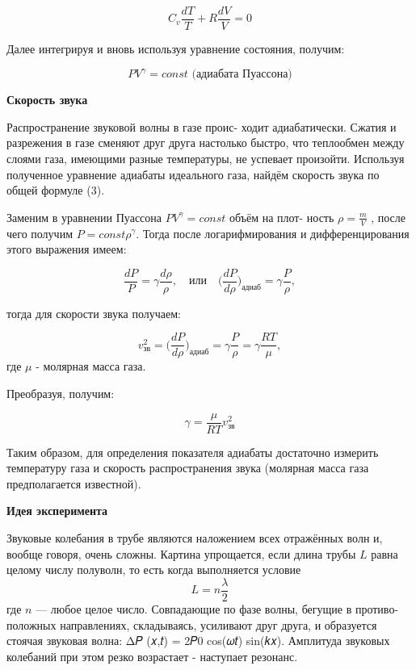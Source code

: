 \documentclass[12pt]{article}
\begin{document}
    \begin{equation}
        C_v \frac{dT}{T} + R \frac{dV}{V} = 0
    \end{equation}

    Далее интегрируя и вновь используя уравнение состояния, получим:

    \begin{equation}
        PV^{\gamma} = const
        \text{  (адиабата Пуассона)}
    \end{equation}

    \textbf{Скорость звука}

    Распространение звуковой волны в газе проис- ходит адиабатически. Сжатия и разрежения в газе сменяют друг друга настолько быстро, что теплообмен между слоями газа, имеющими разные температуры, не успевает произойти. Используя полученное уравнение адиабаты идеального газа, найдём скорость звука по общей формуле (3).

    Заменим в уравнении Пуассона $PV^{\gamma} = const$ объём на плот- ность $\rho = \frac{m}{V}$ , после чего получим $P = const \rho^{\gamma} $. Тогда после логарифмирования и дифференцирования этого выражения имеем:

    \begin{equation}
        \frac{dP}{P} = \gamma \frac {d\rho}{\rho}, \quad \text{или} \quad \bigg(\frac{dP}{d\rho}\bigg)_\text{адиаб} = \gamma \frac{P}{\rho},
    \end{equation}

    тогда для скорости звука получаем:

    \begin{equation}
        v_\text{зв}^2 = \bigg(\frac{dP}{d\rho}\bigg)_\text{адиаб} = \gamma \frac{P}{\rho} = \gamma \frac{RT}{\mu},
    \end{equation}
    где $\mu$ - молярная масса газа.

    Преобразуя, получим:

    \begin{equation}
        \gamma = \frac{\mu}{RT}v_\text{зв}^2
    \end{equation}

    Таким образом, для определения показателя адиабаты достаточно измерить температуру газа и скорость распространения звука (молярная масса газа предполагается известной).

    \textbf{Идея эксперимента}

    Звуковые колебания в трубе являются наложением всех отражённых волн и, вообще говоря, очень сложны. Картина упрощается, если длина трубы $𝐿$ равна целому числу полуволн, то есть когда выполняется условие
    \begin{equation}
        L = n\frac{\lambda}{2}
    \end{equation}
    где $n$ — любое целое число. Совпадающие по фазе волны, бегущие в противо- положных направлениях, складываясь, усиливают друг друга, и образуется стоячая звуковая волна:
    Δ𝑃 (𝑥,𝑡) = 2𝑃0 cos(𝜔𝑡) sin(𝑘𝑥).
    Амплитуда звуковых колебаний при этом резко возрастает - наступает резонанс.
\end{document}
